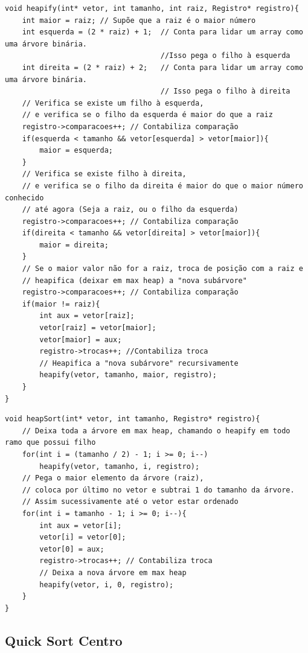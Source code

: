 \documentclass[12pt]{article}
\begin{document}
\begin{lstlisting}
void heapify(int* vetor, int tamanho, int raiz, Registro* registro){
    int maior = raiz; // Supõe que a raiz é o maior número
    int esquerda = (2 * raiz) + 1;  // Conta para lidar um array como uma árvore binária. 
                                    //Isso pega o filho à esquerda
    int direita = (2 * raiz) + 2;   // Conta para lidar um array como uma árvore binária. 
                                    // Isso pega o filho à direita
    // Verifica se existe um filho à esquerda, 
    // e verifica se o filho da esquerda é maior do que a raiz
    registro->comparacoes++; // Contabiliza comparação
    if(esquerda < tamanho && vetor[esquerda] > vetor[maior]){
        maior = esquerda;
    }
    // Verifica se existe filho à direita, 
    // e verifica se o filho da direita é maior do que o maior número conhecido 
    // até agora (Seja a raiz, ou o filho da esquerda)
    registro->comparacoes++; // Contabiliza comparação
    if(direita < tamanho && vetor[direita] > vetor[maior]){
        maior = direita;
    }
    // Se o maior valor não for a raiz, troca de posição com a raiz e
    // heapifica (deixar em max heap) a "nova subárvore"
    registro->comparacoes++; // Contabiliza comparação
    if(maior != raiz){
        int aux = vetor[raiz];
        vetor[raiz] = vetor[maior];
        vetor[maior] = aux;
        registro->trocas++; //Contabiliza troca
        // Heapifica a "nova subárvore" recursivamente
        heapify(vetor, tamanho, maior, registro);
    }
}
\end{lstlisting}

\begin{lstlisting}
void heapSort(int* vetor, int tamanho, Registro* registro){
    // Deixa toda a árvore em max heap, chamando o heapify em todo ramo que possui filho
    for(int i = (tamanho / 2) - 1; i >= 0; i--)
        heapify(vetor, tamanho, i, registro);
    // Pega o maior elemento da árvore (raiz), 
    // coloca por último no vetor e subtrai 1 do tamanho da árvore.
    // Assim sucessivamente até o vetor estar ordenado
    for(int i = tamanho - 1; i >= 0; i--){
        int aux = vetor[i];
        vetor[i] = vetor[0];
        vetor[0] = aux;
        registro->trocas++; // Contabiliza troca
        // Deixa a nova árvore em max heap
        heapify(vetor, i, 0, registro);
    }
}
\end{lstlisting}

\newpage

\subsection{Quick Sort Centro}
\end{document}
